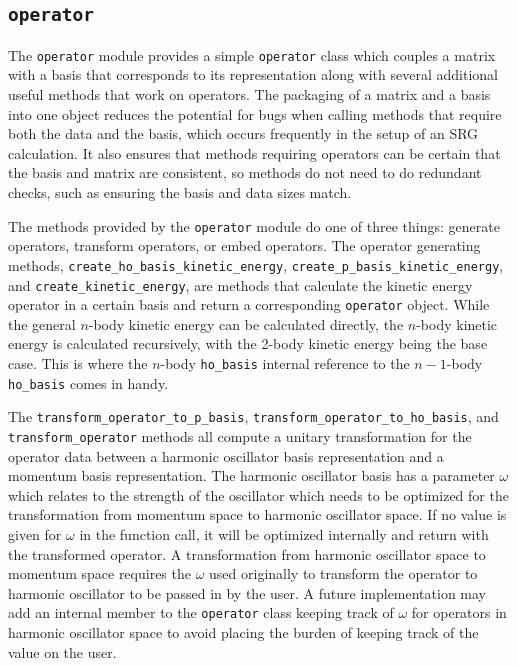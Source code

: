 \subsection{\texttt{operator}}

The \texttt{operator} module provides a simple \texttt{operator} class which couples a matrix with a basis that corresponds to its representation along with several additional useful methods that work on operators. The packaging of a matrix and a basis into one object reduces the potential for bugs when calling methods that require both the data and the basis, which occurs frequently in the setup of an SRG calculation. It also ensures that methods requiring operators can be certain that the basis and matrix are consistent, so methods do not need to do redundant checks, such as ensuring the basis and data sizes match.

The methods provided by the \texttt{operator} module do one of three things: generate operators, transform operators, or embed operators. The operator generating methods, \texttt{create\_ho\_basis\_kinetic\_energy}, \texttt{create\_p\_basis\_kinetic\_energy}, and \texttt{create\_kinetic\_energy}, are methods that calculate the kinetic energy operator in a certain basis and return a corresponding \texttt{operator} object. While the general $n$-body kinetic energy can be calculated directly, the $n$-body kinetic energy is calculated recursively, with the 2-body kinetic energy being the base case. This is where the $n$-body \texttt{ho\_basis} internal reference to the $n-1$-body \texttt{ho\_basis} comes in handy.

The \texttt{transform\_operator\_to\_p\_basis}, \texttt{transform\_operator\_to\_ho\_basis}, and \texttt{transform\_operator} methods all compute a unitary transformation for the operator data between a harmonic oscillator basis representation and a momentum basis representation. The harmonic oscillator basis has a parameter $\omega$ which relates to the strength of the oscillator which needs to be optimized for the transformation from momentum space to harmonic oscillator space. If no value is given for $\omega$ in the function call, it will be optimized internally and return with the transformed operator. A transformation from harmonic oscillator space to momentum space requires the $\omega$ used originally to transform the operator to harmonic oscillator to be passed in by the user. A future implementation may add an internal member to the \texttt{operator} class keeping track of $\omega$ for operators in harmonic oscillator space to avoid placing the burden of keeping track of the value on the user.

